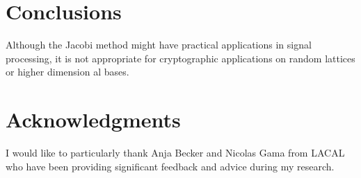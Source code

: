 \documentclass[10pt, a4paper]{article}
\newcommand{\my}[1]{{\color{blue} #1 }}
\begin{document}
\section{Conclusions}

Although the Jacobi method might have practical applications in signal processing, it is not appropriate for cryptographic applications on random lattices or higher dimension\my{al} bases. 

\section{Acknowledgments}
I would like to particularly thank Anja Becker and Nicolas Gama from LACAL who have been providing significant feedback and advice during my research.



\end{document}
